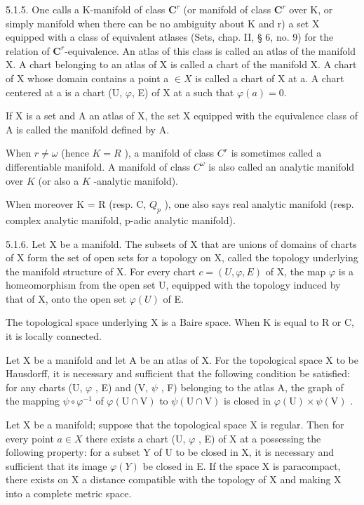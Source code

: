 5.1.5. One calls a K-manifold of class \(\mathbf{C}^{r}\) (or manifold of class \(\mathbf{C}^{r}\) over K, or simply manifold when there can be no ambiguity about K and r) a set X equipped with a class of equivalent atlases (Sets, chap. II, § 6, no. 9) for the relation of \(\mathbf{C}^{r}\)-equivalence. An atlas of this class is called an atlas of the manifold X. A chart belonging to an atlas of X is called a chart of the manifold X. A chart of X whose domain contains a point a \(\in X\) is called a chart of X at a. A chart centered at a is a chart (U, \(\varphi\), E) of X at a such that \(\varphi(a) = 0\).

If X is a set and A an atlas of X, the set X equipped with the equivalence class of A is called the manifold defined by A.

When \(r \neq \omega\) (hence \(K = R\) ), a manifold of class \(C^r\) is sometimes called a differentiable manifold. A manifold of class \(C^\omega\) is also called an analytic manifold over \(K\) (or also a \(K\) -analytic manifold).

When moreover K = R (resp. C, \(Q_{p}\) ), one also says real analytic manifold (resp. complex analytic manifold, p-adic analytic manifold).

5.1.6. Let X be a manifold. The subsets of X that are unions of domains of charts of X form the set of open sets for a topology on X, called the topology underlying the manifold structure of X. For every chart \(c = (U, \varphi, E)\) of X, the map \(\varphi\) is a homeomorphism from the open set U, equipped with the topology induced by that of X, onto the open set \(\varphi(U)\) of E.

The topological space underlying X is a Baire space. When K is equal to R or C, it is locally connected.

Let X be a manifold and let A be an atlas of X. For the topological space X to be Hausdorff, it is necessary and sufficient that the following condition be satisfied: for any charts (U, \(\varphi\) , E) and (V, \(\psi\) , F) belonging to the atlas A, the graph of the mapping \(\psi \circ \varphi^{-1}\) of \(\varphi(\mathrm{U} \cap \mathrm{V})\) to \(\psi(\mathrm{U} \cap \mathrm{V})\) is closed in \(\varphi(\mathrm{U}) \times \psi(\mathrm{V})\) .

Let X be a manifold; suppose that the topological space X is regular. Then for every point \(a \in X\) there exists a chart (U, \(\varphi\) , E) of X at a possessing the following property: for a subset Y of U to be closed in X, it is necessary and sufficient that its image \(\varphi(Y)\) be closed in E. If the space X is paracompact, there exists on X a distance compatible with the topology of X and making X into a complete metric space.

